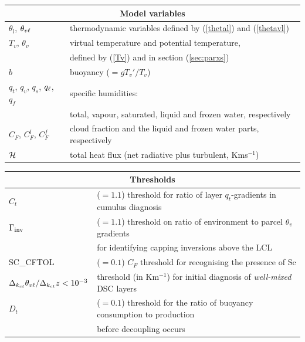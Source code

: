 \documentclass{UMDP_article}
\begin{document}
\begin{flushleft}
  \begin{tabular}{|l|l|}
    \hline
    \multicolumn{2}{|c|}{Model variables} \\
    \hline
    $\theta_l$, $\theta_{v\ell}$  & thermodynamic variables defined by (\ref{thetal})
    and (\ref{thetavl}) \\
    $T_v$, $\theta_v$ & virtual temperature and potential temperature, \\ 
    & defined by (\ref{Tv}) and in section (\ref{sec:parxs}) \\
    $b$               & buoyancy ($=g T_v'/T_v$) \\
    $q_t$, $q_v$, $q_s$, $q_{\ell}$, $q_f$ & specific humidities: \\ 
    & total, vapour, saturated, liquid and frozen water, respectively \\ 
    $C_F$, $C_F^l$, $C_F^f$ & cloud fraction and the liquid and frozen water
    parts, respectively \\
    ${\cal H}$ &  total heat flux (net radiative plus turbulent, Kms$^{-1}$) \\
    \hline
  \end{tabular}
\end{flushleft}

\begin{flushleft}
  \begin{tabular}{|l|l|}
    \hline
    \multicolumn{2}{|c|}{Thresholds} \\
    \hline
    $C_t$ & ($=1.1$) threshold for ratio of layer $q_t$-gradients in cumulus
    diagnosis \\ 
    $\Gamma_{\rm inv}$ & ($=1.1$) threshold on ratio of environment to parcel 
    $\theta_v$ gradients \\
    & for identifying capping inversions above the LCL \\
    SC\_CFTOL & ($=0.1$) $C_F$ threshold for recognising the presence of Sc \\
    $\Delta_{k_{ct}} \theta_{v\ell} / \Delta_{k_{ct}} z < 10^{-3}$ & threshold
    (in Km$^{-1}$) for initial diagnosis of {\em well-mixed} DSC layers \\
    $D_t$  & ($=0.1$) threshold for the ratio of buoyancy consumption to
    production \\ 
    & before decoupling occurs \\
    \hline
  \end{tabular}
\end{flushleft}
\end{document}
